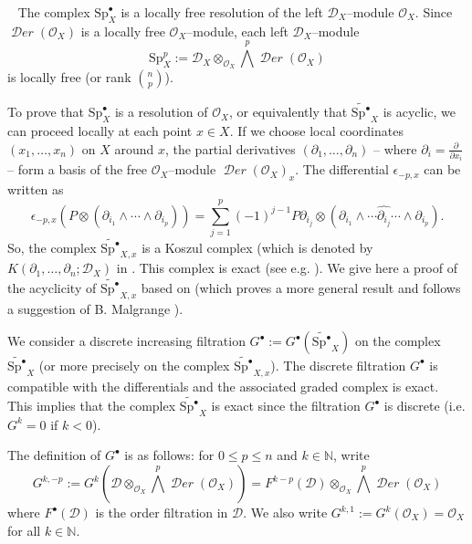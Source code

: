 \documentclass[12pt]{article}
\newcommand{\NN}{\mathbb{N}}
\DeclareMathOperator{\fDer}{\mathcal{D}\mathit{er}}
\newcommand{\OO}{\mathcal{O}}
\newcommand{\DD}{\mathcal{D}}
\newcommand{\Spb}{{\mathrm{Sp}}^\bullet} %
\newcommand{\Sp}{{\mathrm{Sp}}}
\newcommand{\cD}{\DD}
\newcommand{\cO}{\OO}
\newcounter{numero}[section]
\renewcommand{\thenumero}{(\arabic{section}.\arabic{numero})}
\newenvironment{nota}{\medskip
\refstepcounter{numero}\noindent {\sc  \thenumero\ Remark.}\
}{\vspace{1ex}\par}
\begin{document}
\begin{nota}\label{SP-free-resolution-OX}
The complex $\Spb_X$ is a locally free resolution of the left $\cD_X$--module $\cO_X$. Since $\fDer(\cO_X)$ is a locally free $\cO_X$--module, each left $\cD_X$--module $$\Sp_X^p  := \DD_X \otimes_{\cO_X} \bigwedge^p \fDer(\cO_X)$$ is locally free (or rank $\binom{n}{p}$).

To prove that $\Spb_X$ is a resolution of $\cO_X$, or equivalently that $\widetilde{\Spb}_X$ is acyclic, we can proceed locally at each point $x\in X$. If we choose local coordinates $(x_1,\ldots,x_n)$ on $X$ around $x$, the partial derivatives $(\partial_1,\ldots,\partial_n)$ -- where $\partial_i = \frac{\partial}{\partial x_i}$ -- form a basis of the free $\cO_X$--module $\fDer(\cO_X)_x$. The differential $\epsilon_{-p,x}$ can be written as
$$ \epsilon_{-p,x}(P\otimes (\partial_{i_1} \wedge \cdots \wedge \partial_{i_p}))  = \sum_{j=1}^p (-1)^{j-1}P\partial_{i_j} \otimes (\partial_{i_1} \wedge \cdots \widehat{\partial_{i_j}} \cdots \wedge \partial_{i_p}).$$
So, the complex $\widetilde{\Spb}_{X,x}$ is a Koszul complex (which is denoted by $K(\partial_1, \ldots,\partial_n; \DD_X)$ in \cite[I.2]{Malgrange-cimpa-niza}. This complex is exact (see e.g. \cite{Frisch}). We give here a proof of the acyclicity of $\widetilde{\Spb}_{X,x}$ based on  \cite[Th. 3.1.2; Prop. 4.1.3]{calde_ens} (which proves a more general result and follows a suggestion of B. Malgrange \cite[I.2]{Malgrange-cimpa-niza}).

We consider a discrete increasing filtration $G^\bullet:=G^\bullet\left(\widetilde{\Spb}_{X}\right)$ on the complex $\widetilde{\Spb}_{X}$ (or more precisely on the complex $\widetilde{\Spb}_{X,x}$). The discrete filtration $G^\bullet$ is compatible with the differentials and the associated graded complex is exact. This implies that the complex $\widetilde{\Spb}_{X}$ is exact since the filtration $G^\bullet$ is discrete (i.e. $G^k=0$ if $k<0$).

The definition of $G^{\bullet}$ is as follows:  for $0 \leq p \leq n$ and $k\in \NN$, write $$G^{k,-p}:=G^k\left(\DD \otimes_{\cO_X} \bigwedge^p \fDer(\cO_X)\right) = F^{k-p}(\DD) \otimes _{\cO_X} \bigwedge^p \fDer(\cO_X)$$  where $F^\bullet(\DD)$ is the order filtration in $\DD$. We also write $G^{k,1}:=G^k(\cO_X)= \cO_X$ for all $k\in \NN$.


\end{nota}
\end{document}
